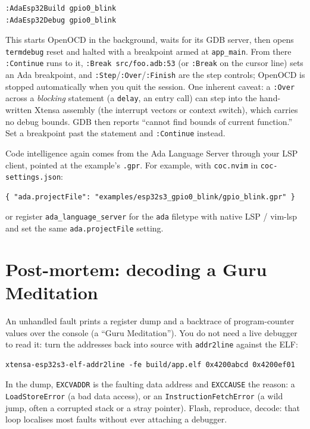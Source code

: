 \begin{lstlisting}[style=sh]
:AdaEsp32Build gpio0_blink
:AdaEsp32Debug gpio0_blink
\end{lstlisting}

This starts OpenOCD in the background, waits for its GDB server, then opens
\texttt{termdebug} reset and halted with a breakpoint armed at \texttt{app\_main}.
From there \texttt{:Continue} runs to it, \texttt{:Break src/foo.adb:53} (or
\texttt{:Break} on the cursor line) sets an Ada breakpoint, and
\texttt{:Step}/\texttt{:Over}/\texttt{:Finish} are the step controls; OpenOCD is
stopped automatically when you quit the session. One inherent caveat: a
\texttt{:Over} across a \emph{blocking} statement (a \texttt{delay}, an entry
call) can step into the hand-written Xtensa assembly (the interrupt vectors or
context switch), which carries no debug bounds. GDB then reports ``cannot find
bounds of current function.'' Set a breakpoint past the statement and
\texttt{:Continue} instead.

Code intelligence again comes from the Ada Language Server through your LSP
client, pointed at the example's \texttt{.gpr}. For example, with
\texttt{coc.nvim} in \texttt{coc-settings.json}:

\begin{lstlisting}[style=sh]
{ "ada.projectFile": "examples/esp32s3_gpio0_blink/gpio_blink.gpr" }
\end{lstlisting}

or register \texttt{ada\_language\_server} for the \texttt{ada} filetype with
native LSP / vim-lsp and set the same \texttt{ada.projectFile} setting.

\section{Post-mortem: decoding a Guru Meditation}

An unhandled fault prints a register dump and a backtrace of program-counter
values over the console (a ``Guru Meditation''). You do not need a live debugger
to read it: turn the addresses back into source with \texttt{addr2line} against
the ELF:

\begin{lstlisting}[style=sh]
xtensa-esp32s3-elf-addr2line -fe build/app.elf 0x4200abcd 0x4200ef01
\end{lstlisting}

In the dump, \texttt{EXCVADDR} is the faulting data address and \texttt{EXCCAUSE}
the reason: a \texttt{LoadStoreError} (a bad data access), or an
\texttt{InstructionFetchError} (a wild jump, often a corrupted stack or a stray
pointer). Flash, reproduce, decode: that loop localises most faults without ever
attaching a debugger.

